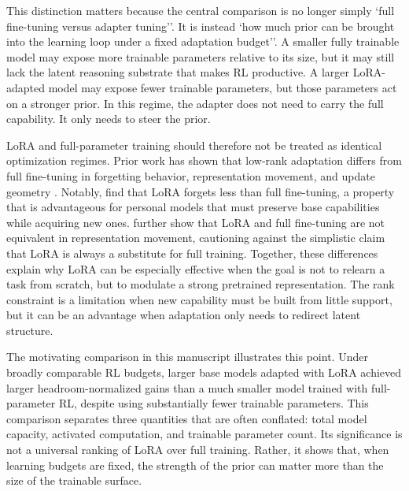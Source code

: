\documentclass{llmxive}
\begin{document}
This distinction matters because the central comparison is no longer simply `full fine-tuning versus adapter tuning''. It is instead `how much prior can be brought into the learning loop under a fixed adaptation budget''. A smaller fully trainable model may expose more trainable parameters relative to its size, but it may still lack the latent reasoning substrate that makes RL productive. A larger LoRA-adapted model may expose fewer trainable parameters, but those parameters act on a stronger prior. In this regime, the adapter does not need to carry the full capability. It only needs to steer the prior.

LoRA and full-parameter training should therefore not be treated as identical optimization regimes. Prior work has shown that low-rank adaptation differs from full fine-tuning in forgetting behavior, representation movement, and update geometry \citep{biderman2024loraforgets,shuttleworth2025loraillusion}. Notably, \citet{biderman2024loraforgets} find that LoRA forgets less than full fine-tuning, a property that is advantageous for personal models that must preserve base capabilities while acquiring new ones. \citet{shuttleworth2025loraillusion} further show that LoRA and full fine-tuning are not equivalent in representation movement, cautioning against the simplistic claim that LoRA is always a substitute for full training. Together, these differences explain why LoRA can be especially effective when the goal is not to relearn a task from scratch, but to modulate a strong pretrained representation. The rank constraint is a limitation when new capability must be built from little support, but it can be an advantage when adaptation only needs to redirect latent structure.

The motivating comparison in this manuscript illustrates this point. Under broadly comparable RL budgets, larger base models adapted with LoRA achieved larger headroom-normalized gains than a much smaller model trained with full-parameter RL, despite using substantially fewer trainable parameters. This comparison separates three quantities that are often conflated: total model capacity, activated computation, and trainable parameter count. Its significance is not a universal ranking of LoRA over full training. Rather, it shows that, when learning budgets are fixed, the strength of the prior can matter more than the size of the trainable surface.
\end{document}
